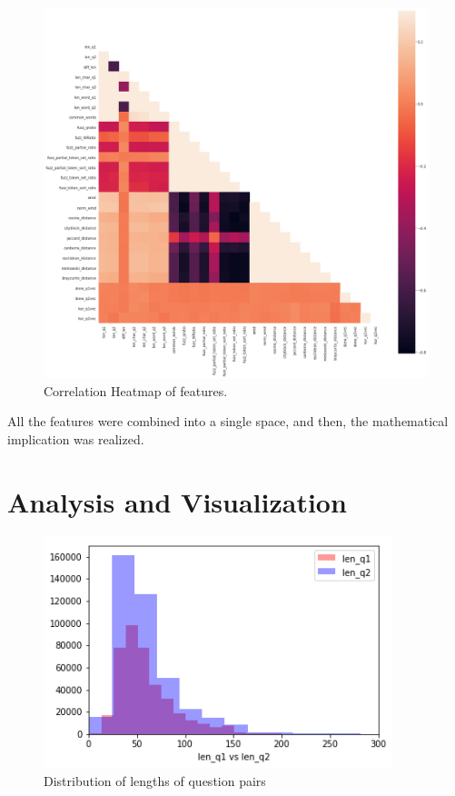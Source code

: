 \begin{figure}[tbh]
	\begin{center}
		\includegraphics[width = 5.9in]{images/heatmap.png}
		\caption{Correlation Heatmap of features.}
		\label{heatmap}
	\end{center}
\end{figure}	

\par All the features were combined into a single space, and then, the mathematical implication was realized.

\clearpage
\section{Analysis and Visualization}
\begin{figure}[tbh]
\begin{center}
	\includegraphics[width=4in]{images/len.png}
	\caption{Distribution of lengths of question pairs}
	\label{len}
\end{center}
\end{figure}

